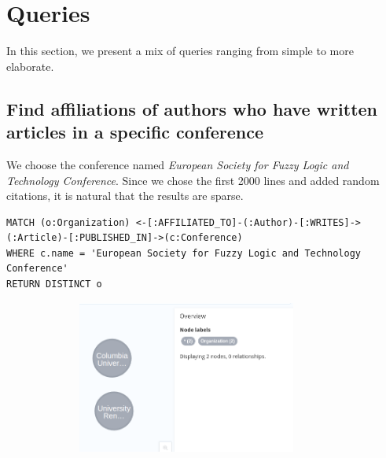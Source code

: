 \documentclass{Configuration_Files/PoliMi3i_thesis}
\begin{document}
\section{Queries}
In this section, we present a mix of queries ranging from simple to more elaborate.
\subsection{Find affiliations of authors who have written articles in a specific conference} 
We choose the conference named \textit{European Society for Fuzzy Logic and Technology Conference}. Since we chose the first 2000 lines and added random citations, it is natural that the results are sparse.\\
\begin{lstlisting}[language=cypher, label=lst:cypher-example]
MATCH (o:Organization) <-[:AFFILIATED_TO]-(:Author)-[:WRITES]->(:Article)-[:PUBLISHED_IN]->(c:Conference)
WHERE c.name = 'European Society for Fuzzy Logic and Technology Conference'
RETURN DISTINCT o
\end{lstlisting}
\begin{figure}[H]
    \centering
    \includegraphics[width=100mm, height=50mm]{Images/query_1.png}
        \caption{}
    \label{fig:quadtree}
\end{figure}
\end{document}
